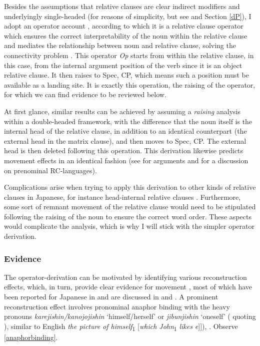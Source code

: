 Besides the assumptions that relative clauses are clear indirect modifiers and underlyingly single-headed (for reasons of simplicity, but see \citealt{cinque:2020:relcl} and Section \ref{dP}), I adopt an operator account \citep{ishii:1991:operators, miyamoto:2017:RC}, according to which it is a relative clause operator which ensures the correct interpretability of the noun within the relative clause and mediates the relationship between noun and relative clause, solving the connectivity problem \citep{salzmann:2017:reconstruction}. This operator \textit{Op} starts from within the relative clause, in this case, from the internal argument position of the verb since it is an object relative clause. It then raises to Spec, CP, which means such a position must be available as a landing site. It is exactly this operation, the raising of the operator, for which we can find evidence to be reviewed below.

At first glance, similar results can be achieved by assuming a \textit{raising} analysis within a double-headed framework, with the difference that the noun itself is the internal head of the relative clause, in addition to an identical counterpart (the external head in the matrix clause), and then moves to Spec, CP. The external head is then deleted following this operation. This derivation likewise predicts movement effects in an identical fashion (see \citealt[22–36]{cinque:2020:relcl} for arguments and \citealt[65–71]{cinque:2020:relcl} for a discussion on prenominal RC-languages).

Complications arise when trying to apply this derivation to other kinds of relative clauses in Japanese, for instance head-internal relative clauses \citep{hiraiwa:2012:mechanism, hiraiwa:2017:a}. Furthermore, some sort of remnant movement of the relative clause would need to be stipulated following the raising of the noun to ensure the correct word order. These aspects would complicate the analysis, which is why I will stick with the simpler operator derivation.

\subsubsection{Evidence}

The operator-derivation can be motivated by identifying various reconstruction effects, which, in turn, provide clear evidence for movement \citep{schachter:1973:focus, vries:2002:syntax}, most of which have been reported for Japanese in \citet{ishii:1991:operators} and are discussed in \citet{miyamoto:2017:RC} and \citet{whitman:2013:prehead}. A prominent reconstruction effect involves pronominal anaphor binding with the heavy pronouns \textit{karejishin/kanojojishin} `himself/herself' or \textit{jibunjishin} `oneself' (\citealt[615]{miyamoto:2017:RC} quoting \citealt[29]{ishii:1991:operators}), similar to English \textit{the picture of himself}\textsubscript{1} [\textit{which John}\textsubscript{1} \textit{likes e}]]), \citep{salzmann:2017:reconstruction}. Observe \ref{anaphorbinding}.

